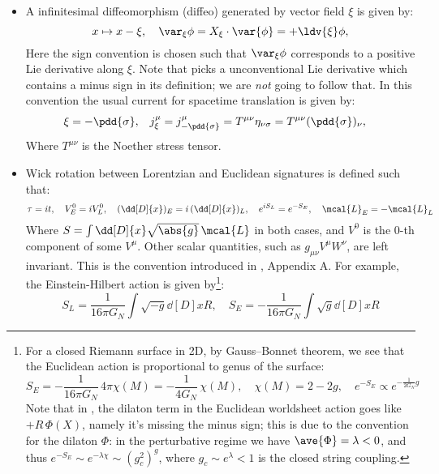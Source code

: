 \documentclass[a4paper
	,10pt
]{article}
\begin{document}
	\begin{itemize}
	\item A infinitesimal diffeomorphism (diffeo) generated by vector field $\xi$ is given by:
	\begin{equation}
		x\mapsto x - \xi,
	\quad
		\var_\xi \phi
		= X_\xi \cdot \var{\phi}
		= +\ldv{\xi} \phi,
	\label{eq:diffeo_convention}
	\end{equation}
	Here the sign convention is chosen such that $\var_\xi \phi$ corresponds to a positive Lie derivative along $\xi$. Note that \textcite{Banados:2016zim} picks a unconventional Lie derivative which contains a minus sign in its definition; we are \textit{not} going to follow that. In this convention the usual current for spacetime translation is given by:
	\begin{equation}
	\begin{aligned}
		\xi &= -\pdd{\sigma},
	&
		j^\mu_\xi
		&= j^\mu_{-\pdd{\sigma}}
		= T^{\mu\nu} \eta_{\nu\sigma}
		= T^{\mu\nu} (\pdd{\sigma})_\nu,
	\end{aligned}
	\label{eq:Noether_stress_convention}
	\end{equation}
	Where $T^{\mu\nu}$ is the Noether stress tensor. 
	
	\item Wick rotation between Lorentzian and Euclidean signatures is defined such that:
	\begin{equation}
		\tau = it,
	\quad
		V^0_E = iV^0_L,
	\quad
		(\dd[D]{x})_E
		= i\,(\dd[D]{x})_L,
	\quad
		e^{iS_L} = e^{-S_E},
	\quad
		\mcal{L}_E
		= -\mcal{L}_L
	\label{eq:Wick_rotation}
	\end{equation}
	Where $
		S = \int \dd[D]{x} \sqrt{\abs{g}}\,\mcal{L}
	$ in both cases, and $V^0$ is the 0-th component of some $V^\mu$. Other scalar quantities, such as $
		g_{\mu\nu} V^\mu W^\nu
	$, are left invariant. This is the convention introduced in \textcite{Polchinski:1998rq}, Appendix A. 
	For example, the Einstein-Hilbert action is given by\footnote{
		For a closed Riemann surface in 2D, by Gauss--Bonnet theorem, we see that the Euclidean action is proportional to genus of the surface:
		\begin{equation}
			S_E = -\frac{1}{16\pi G_N}\,
				4\pi \chi(M)
			= -\frac{1}{4G_N}\,\chi(M),
		\quad
			\chi(M) = 2 - 2g,
		\quad
			e^{-S_E}
			\propto e^{-\frac{1}{2G_N} g}
		\end{equation}
		Note that in \textcite{Polchinski:1998rq}, the dilaton term in the Euclidean worldsheet action  goes like $+R\,\Phi(X)$, namely it's missing the minus sign; this is due to the convention for the dilaton $\Phi$: in the perturbative regime we have $\ave{\Phi} = \lambda < 0$, and thus $
			e^{-S_E} \sim e^{-\lambda \chi}
			\sim (g_c^2)^g
		$, where $
			g_c \sim e^\lambda < 1
		$ is the closed string coupling. 
	}:
	\begin{equation}
		S_L = \frac{1}{16\pi G_N}
			\int \sqrt{-g} \dd[D]{x} R,
	\quad
		S_E = -\frac{1}{16\pi G_N}
			\int \sqrt{g} \dd[D]{x} R
	\end{equation}
	

\end{itemize}
\end{document}
